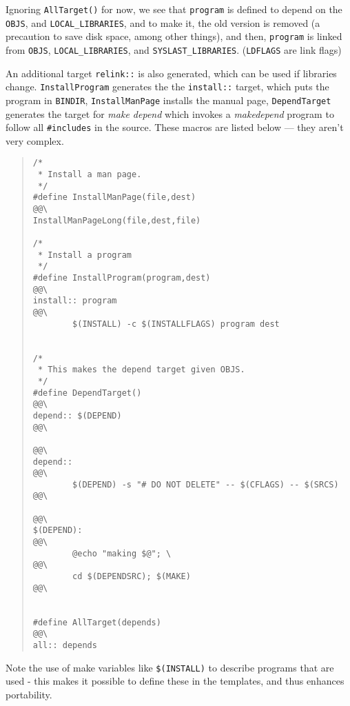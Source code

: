 Ignoring {\tt AllTarget()} for now, we see that {\tt program} is
defined to depend on the {\tt OBJS}, and {\tt LOCAL\_LIBRARIES}, and to
make it, the old version is removed (a precaution to save disk space,
among other things), and then, {\tt program} is linked from {\tt OBJS},
{\tt LOCAL\_LIBRARIES}, and {\tt SYSLAST\_LIBRARIES}.  ({\tt LDFLAGS}
are link flags)

An additional target {\tt relink::} is also generated, which can be
used if libraries change. {\tt InstallProgram} generates the the 
{\tt install::} target, which puts the program in {\tt BINDIR}, 
{\tt InstallManPage} installs the manual page, {\tt DependTarget} generates
the target for {\em make depend} which invokes a {\em makedepend}
program to follow all {\tt \#includes} in the source.  These macros are
listed below --- they aren't very complex.

\begin{quote}
\begin{verbatim}
/*
 * Install a man page.
 */
#define InstallManPage(file,dest)                                       @@\
InstallManPageLong(file,dest,file)

/*
 * Install a program
 */
#define InstallProgram(program,dest)                                    @@\
install:: program                                                       @@\
        $(INSTALL) -c $(INSTALLFLAGS) program dest


/*
 * This makes the depend target given OBJS.
 */
#define DependTarget()                                                  @@\
depend:: $(DEPEND)                                                      @@\
                                                                        @@\
depend::                                                                @@\
        $(DEPEND) -s "# DO NOT DELETE" -- $(CFLAGS) -- $(SRCS)          @@\
                                                                        @@\
$(DEPEND):                                                              @@\
        @echo "making $@"; \                                            @@\
        cd $(DEPENDSRC); $(MAKE)                                        @@\


#define AllTarget(depends)                                              @@\
all:: depends
\end{verbatim}
\end{quote}

Note the use of make variables like {\tt \$(INSTALL)} to describe
programs that are used - this makes it possible to define these in the
templates, and thus enhances portability.

